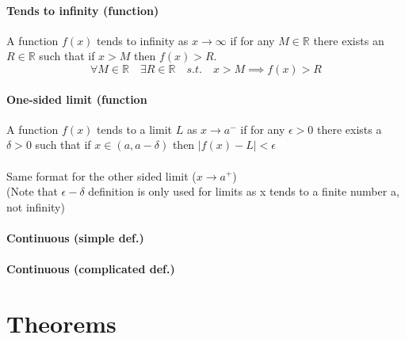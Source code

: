 \documentclass{article}
\newcommand{\R}{\mathbb{R}}
\begin{document}
\paragraph{Tends to infinity (function)}
A function $ f(x) $ tends to infinity as $ x \to \infty $ if for any $ M \in \R $ there exists an $ R \in \R $ such that if $ x > M $ then $ f(x) > R $.
\begin{equation}
\forall M \in \R \quad \exists R \in \R \quad s.t. \quad x > M \implies f(x) > R
\end{equation}
\paragraph{One-sided limit (function}
A function $ f(x) $ tends to a limit $ L $ as $ x \to a^{-} $ if for any $ \epsilon > 0 $ there exists a $ \delta > 0 $ such that if $ x \in (a, a - \delta) $ then $ |f(x) - L| < \epsilon $
\\\\
Same format for the other sided limit ($ x \to a^{+} $)
\\
(Note that $ \epsilon - \delta $ definition is only used for limits as x tends to a finite number a, not infinity)
\paragraph{Continuous (simple def.)}
\paragraph{Continuous (complicated def.)}

\section{Theorems}
\end{document}
